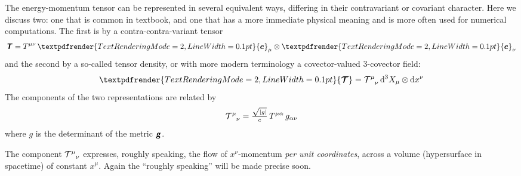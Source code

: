 \documentclass[\ifafour a4paper,12pt,\else a5paper,10pt,\fi%
onecolumn,oneside,article,%
british%
]{memoir}
\newcommand*{\mathte}[1]{\textbf{\textit{\textsf{#1}}}}
\renewcommand*{\bm}[1]{\textpdfrender{TextRenderingMode=2,LineWidth=0.1pt}{\boldsymbol{#1}}}
\newcommand*{\di}{\mathrm{d}}%
\DeclarePairedDelimiter\abs{\lvert}{\rvert}
\renewcommand*{\|}[1][]{\nonscript\:#1\vert\nonscript\:\mathopen{}}
\renewcommand*{\i}{{}\indices}
\newcommand*{\ve}[1]{\bm{e}_{#1}}
\newcommand*{\vi}[1]{\di{#1}}
\newcommand*{\ttti}[1]{\di^{3}X_{#1}}
\newcommand*{\yg}{\mathte{g}}
\newcommand*{\dg}{\sqrt{\abs{g}}}
\newcommand*{\yTTe}{\mathte{T}}
\newcommand*{\yTT}{\bm{\mathcal{T}}}
\newcommand*{\yT}{\mathcal{T}}
\begin{document}
\medskip

The energy-momentum tensor can be represented in several equivalent ways, differing in their contravariant or covariant character. Here we discuss two: one that is common in textbook, and one that has a more immediate physical meaning and is more often used for numerical computations. The first is by a contra-contra-variant tensor
\begin{equation}
  \label{eq:energy-momentum-contraco}
  \yTTe = T\i{^{\mu\nu}}\,\ve{\mu}\otimes\ve{\nu}
\end{equation}
and the second by a so-called tensor density, or with more modern terminology a covector-valued 3-covector field:
\begin{equation}
  \label{eq:energy-momentum-tdens}
  \yTT = \yT\i{^{\mu}_{\nu}}\,\ttti{\mu}\otimes\vi{x^{\nu}}
\end{equation}
The components of the two representations are related by
\begin{equation}
  \label{eq:relation_components_EMt}
  \yT\i{^{\mu}_{\nu}} = \tfrac{\dg}{c} \, T\i{^{\mu\alpha}} \, g_{\alpha\nu}
\end{equation}
where $g$ is the determinant of the metric $\yg$.

The component $\yT\i{^{\mu}_{\nu}}$ expresses, roughly speaking, the flow of $x^{\nu}$-momentum \emph{per unit coordinates}, across a volume (hypersurface in spacetime) of constant $x^{\mu}$. Again the \enquote{roughly speaking} will be made precise soon.
\end{document}
